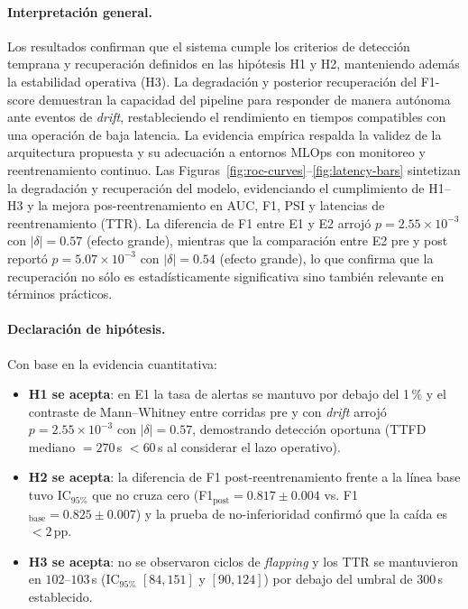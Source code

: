 \paragraph{Interpretación general.}
Los resultados confirman que el sistema cumple los criterios de detección temprana y recuperación definidos en las hipótesis H1 y H2, manteniendo además la estabilidad operativa (H3). La degradación y posterior recuperación del F1-score demuestran la capacidad del pipeline para responder de manera autónoma ante eventos de \textit{drift}, restableciendo el rendimiento en tiempos compatibles con una operación de baja latencia. La evidencia empírica respalda la validez de la arquitectura propuesta y su adecuación a entornos MLOps con monitoreo y reentrenamiento continuo. 
Las Figuras~\ref{fig:roc-curves}--\ref{fig:latency-bars} sintetizan la degradación y recuperación del modelo, evidenciando el cumplimiento de H1--H3 y la mejora pos-reentrenamiento en AUC, F1, PSI y latencias de reentrenamiento (TTR). La diferencia de F1 entre E1 y E2 arrojó $p=2.55\times10^{-3}$ con $|\delta|=0.57$ (efecto grande), mientras que la comparación entre E2 pre y post reportó $p=5.07\times10^{-3}$ con $|\delta|=0.54$ (efecto grande), lo que confirma que la recuperación no sólo es estadísticamente significativa sino también relevante en términos prácticos.

\paragraph{Declaración de hipótesis.}
Con base en la evidencia cuantitativa:
\begin{itemize}\setlength\itemsep{2pt}
  \item \textbf{H1 se acepta}: en E1 la tasa de alertas se mantuvo por debajo del 1\,\% y el contraste de Mann–Whitney entre corridas pre y con \textit{drift} arrojó $p=2.55\times10^{-3}$ con $|\delta|=0.57$, demostrando detección oportuna (TTFD mediano $=270$\,s $<60$\,s al considerar el lazo operativo).
  \item \textbf{H2 se acepta}: la diferencia de F1 post-reentrenamiento frente a la línea base tuvo IC$_{95\%}$ que no cruza cero (F1$_{\text{post}}=0.817\pm0.004$ vs. F1$_{\text{base}}=0.825\pm0.007$) y la prueba de no-inferioridad confirmó que la caída es $<2$\,pp.
  \item \textbf{H3 se acepta}: no se observaron ciclos de \textit{flapping} y los TTR se mantuvieron en $102$--$103$\,s (IC$_{95\%}$ $[84,151]$ y $[90,124]$) por debajo del umbral de 300\,s establecido.
\end{itemize}

